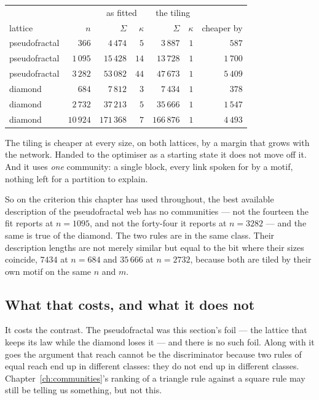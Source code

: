 \begin{center}
\footnotesize\setlength{\tabcolsep}{5pt}
\begin{tabular}{lrrrrrr}
\hline
 & & \multicolumn{2}{c}{as fitted} & \multicolumn{2}{c}{the tiling} & \\
lattice & $n$ & $\Sigma$ & $\kappa$ & $\Sigma$ & $\kappa$ & cheaper by\\
\hline
pseudofractal & $366$    & $4\,474$   & $5$  & $3\,887$   & $1$ & $587$\\
pseudofractal & $1\,095$  & $15\,428$  & $14$ & $13\,728$  & $1$ & $1\,700$\\
pseudofractal & $3\,282$  & $53\,082$  & $44$ & $47\,673$  & $1$ & $5\,409$\\
diamond       & $684$    & $7\,812$   & $3$  & $7\,434$   & $1$ & $378$\\
diamond       & $2\,732$  & $37\,213$  & $5$  & $35\,666$  & $1$ & $1\,547$\\
diamond       & $10\,924$ & $171\,368$ & $7$  & $166\,876$ & $1$ & $4\,493$\\
\hline
\end{tabular}
\end{center}

\noindent The tiling is cheaper at every size, on both lattices, by a margin that
grows with the network. Handed to the optimiser as a starting state it does not
move off it. And it uses \emph{one} community: a single block, every link spoken
for by a motif, nothing left for a partition to explain.

So on the criterion this chapter has used throughout, the best available
description of the pseudofractal web has no communities --- not the fourteen the
fit reports at $n=1095$, and not the forty-four it reports at $n=3282$ --- and the
same is true of the diamond. The two rules are in the same class. Their
description lengths are not merely similar but equal to the bit where their sizes
coincide, $7434$ at $n=684$ and $35\,666$ at $n=2732$, because both are tiled by
their own motif on the same $n$ and $m$.

\subsection*{What that costs, and what it does not}

It costs the contrast. The pseudofractal was this section's foil --- the lattice
that keeps its law while the diamond loses it --- and there is no such foil.
Along with it goes the argument that reach cannot be the discriminator because
two rules of equal reach end up in different classes: they do not end up in
different classes. Chapter~\ref{ch:communities}'s ranking of a triangle rule
against a square rule may still be telling us something, but not this.

